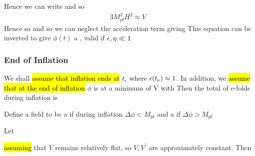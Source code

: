 \documentclass{article}
\begin{document}
Hence we can write 
and so  
\begin{align}\label{eq:CSM:14}
3 M_{pl}^2 H^2 \approx V 
\end{align}
Hence 
so 
and so we can neglect the acceleration term giving 
This equation can be inverted to give $\phi(t)$ a , valid if $\epsilon,\eta \ll 1$

\subsubsection*{End of Inflation}
We shall \hl{assume that inflation ends at} $t_e$ where $\epsilon(t_e)\approx 1$. In addition, we \hl{assume that at the end of inflation} $\phi$ is at a minimum of V with 
Then the total of e-folds during inflation is 

\begin{definition}
Define a field to be a  if during inflation $\Delta \phi < M_{pl}$ and a  if $\Delta \phi > M_{pl}$
\end{definition}

\begin{definition}
Let 
\end{definition}
\hl{assuming} that $V$ remains relatively flat, so $V,V^\prime$ are approximately constant. Then 
\end{document}
